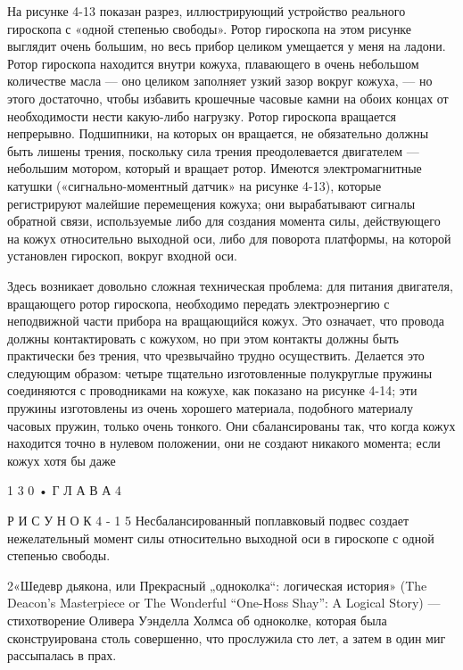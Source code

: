 \documentclass[10pt,oneside]{article}
\begin{document}
На рисунке 4-13 показан разрез, иллюстрирующий устройство реального гироскопа с «одной степенью свободы». Ротор гироскопа на этом рисунке выглядит очень большим, но весь прибор целиком умещается у меня на ладони. Ротор гироскопа находится внутри кожуха, плавающего в очень небольшом количестве масла --- оно целиком заполняет узкий зазор вокруг кожуха, --- но этого достаточно, чтобы избавить крошечные часовые камни на обоих концах от необходимости нести какую-либо нагрузку. Ротор гироскопа вращается непрерывно. Подшипники, на которых он вращается, не обязательно должны быть лишены трения, поскольку сила трения преодолевается двигателем --- небольшим мотором, который и вращает ротор. Имеются электромагнитные катушки («сигнально-моментный датчик» на рисунке 4-13), которые регистрируют малейшие перемещения кожуха; они вырабатывают сигналы обратной связи, используемые либо для создания момента силы, действующего на кожух относительно выходной оси, либо для поворота платформы, на которой установлен гироскоп, вокруг входной оси.\par

Здесь возникает довольно сложная техническая проблема: для питания двигателя, вращающего ротор гироскопа, необходимо передать электроэнергию с неподвижной части прибора на вращающийся кожух. Это означает, что провода должны контактировать с кожухом, но при этом контакты должны быть практически без трения, что чрезвычайно трудно осуществить. Делается это следующим образом: четыре тщательно изготовленные полукруглые пружины соединяются с проводниками на кожухе, как показано на рисунке 4-14; эти пружины изготовлены из очень хорошего материала, подобного материалу часовых пружин, только очень тонкого. Они сбалансированы так, что когда кожух находится точно в нулевом положении, они не создают никакого момента; если кожух хотя бы даже\par

1 3 0 • Г Л А В А  4\par

Р И С У Н О К  4 - 1 5 Несбалансированный поплавковый подвес создает нежелательный момент силы относительно выходной оси в гироскопе с одной степенью свободы.\par

2«Шедевр дьякона, или Прекрасный „одноколка“: логическая история» (The Deacon’s Masterpiece or The Wonderful “One-Hoss Shay”: A Logical Story) --- стихотворение Оливера Уэнделла Холмса об одноколке, которая была сконструирована столь совершенно, что прослужила сто лет, а затем в один миг рассыпалась в прах.\par
\end{document}
